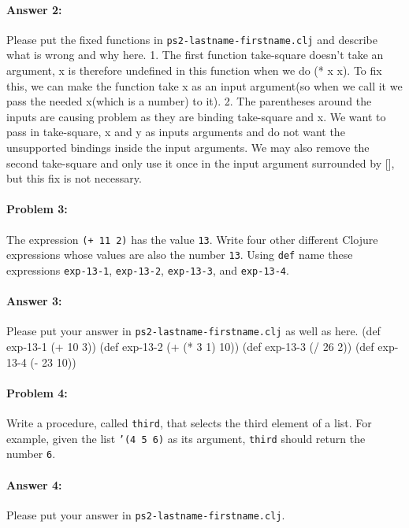 \documentclass[10pt]{article}
\newcommand{\PSnum}{2}
\begin{document}
\paragraph{Answer 2:} Please put the fixed functions in
\texttt{ps\PSnum-lastname-firstname.clj} and describe what is wrong and why
here.
1. The first function take-square doesn't take an argument, x is therefore undefined in this function when we do (* x x).
To fix this, we can make the function take x as an input argument(so when we call it we pass the needed x(which is a number) to it).
2. The parentheses around the inputs are causing problem as they are binding take-square and x. We want to pass in take-square, x and y as 
inputs arguments and do not want the unsupported bindings inside the input arguments. 
We may also remove the second take-square and only use it once in the input argument surrounded by [], but this fix is not necessary. 
\noindent\hrulefill %

\paragraph{Problem 3:}
The expression \texttt{(+ 11 2)} has the value \texttt{13}. Write four
other different Clojure expressions whose values are also the number
\texttt{13}.  Using \texttt{def} name these expressions
\texttt{exp-13-1}, \texttt{exp-13-2}, \texttt{exp-13-3}, and
\texttt{exp-13-4}.

\paragraph{Answer 3:} Please put your answer in \texttt{ps\PSnum-lastname-firstname.clj} as
well as here.
(def exp-13-1 (+ 10 3))
(def exp-13-2 (+ (* 3 1) 10))
(def exp-13-3 (/ 26 2))
(def exp-13-4 (- 23 10))

\noindent\hrulefill %

\paragraph{Problem 4:}
  Write a procedure, called \texttt{third}, that selects the third
  element of a list. For example, given the list \texttt{'(4 5 6)}
  as its argument, \texttt{third} should return the number \texttt{6}.

\paragraph{Answer 4:} Please put your answer in \texttt{ps\PSnum-lastname-firstname.clj}.
\end{document}
